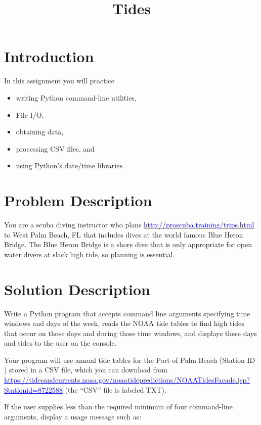 \documentclass[12pt]{article}
\title{Tides}
\author{}
\date{}
\newcommand{\link}[2]{\href{#1}{\textcolor{blue}{\underline{#2}}}}
\begin{document}
\maketitle
\vspace{-1in}
\section{Introduction}

In this assignment you will practice
\begin{itemize}
\itemsep0em
\item writing Python command-line utilities,
\item File I/O,
\item obtaining data,
\item processing CSV files, and
\item using Python's date/time libraries.
\end{itemize}

\section{Problem Description}

You are a scuba diving instructor who plans \link{dive trips}{http://proscuba.training/trips.html} to West Palm Beach, FL that includes dives at the world famous Blue Heron Bridge. The Blue Heron Bridge is a shore dive that is only appropriate for open water divers at slack high tide, so planning is essential.

\section{Solution Description}

Write a Python program that accepts command line arguments specifying time windows and days of the week, reads the NOAA tide tables to find high tides that occur on those days and during those time windows, and displays these days and tides to the user on the console.

Your program will use annual tide tables for the Port of Palm Beach (Station ID ) stored in a CSV file, which you can download from \link{NOAA's Tides and Currents Service}{https://tidesandcurrents.noaa.gov/noaatidepredictions/NOAATidesFacade.jsp?Stationid=8722588} (the ``CSV'' file is labeled TXT).

If the user supplies less than the required minimum of four command-line arguments, display a usage message such as:
\end{document}
